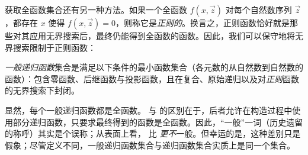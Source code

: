 \documentclass[../../../include/open-logic-section]{subfiles}
\begin{document}

获取全函数集合还有另一种方法。如果一个全函数 $f(x,\vec z)$ 对每个自然数序列 $\vec z$，都存在 $x$ 使得 $f(x,\vec z) = 0$，则称它是\emph{正则的}。换言之，正则函数恰好就是那些对其应用无界搜索后，最终仍能得到全函数的函数。因此，我们可以保守地将无界搜索限制于正则函数：

\begin{defn}
\emph{一般递归函数}集合是满足以下条件的最小函数集合（各元数的从自然数到自然数的函数）：包含零函数、后继函数与投影函数，且在复合、原始递归以及对\emph{正则}函数的无界搜索下封闭。
\end{defn}

显然，每个一般递归函数都是全函数。 与  的区别在于，后者允许在构造过程中使用部分递归函数，只要求最终得到的函数是全函数。因此，“一般”一词（历史遗留的称呼）其实是个误称；从表面上看， 比  \emph{更不}一般。但幸运的是，这种差别只是假象；尽管定义不同，一般递归函数集合与递归函数集合实质上是同一个集合。
\end{document}
